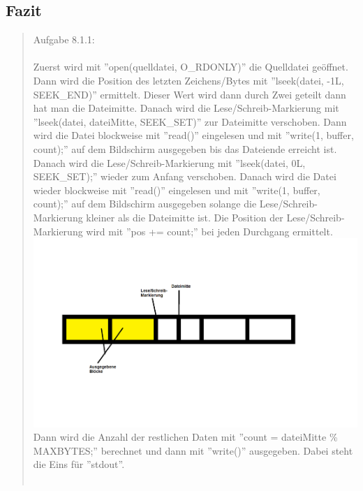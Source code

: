 	\subsection{Fazit}
		\begin{quote}
			Aufgabe 8.1.1:\\ \\
			\small
			\normalsize Zuerst wird mit ''open(quelldatei, O\_RDONLY)'' die Quelldatei ge\"offnet. Dann wird die Position des letzten Zeichens/Bytes mit ''lseek(datei, -1L, SEEK\_END)'' ermittelt. Dieser Wert wird dann durch Zwei geteilt dann hat man die Dateimitte. Danach wird die Lese/Schreib-Markierung mit ''lseek(datei, dateiMitte, SEEK\_SET)'' zur Dateimitte verschoben. Dann wird die Datei blockweise mit ''read()'' eingelesen und mit ''write(1, buffer, count);'' auf dem Bildschirm ausgegeben bis das Dateiende erreicht ist. Danach wird die Lese/Schreib-Markierung mit ''lseek(datei, 0L, SEEK\_SET);'' wieder zum Anfang verschoben. Danach wird die Datei wieder blockweise mit ''read()'' eingelesen und mit ''write(1, buffer, count);'' auf dem Bildschirm ausgegeben solange die Lese/Schreib-Markierung kleiner als die Dateimitte ist. Die Position der Lese/Schreib-Markierung  wird mit ''pos += count;'' bei jeden Durchgang ermittelt.\\
			\includegraphics[width=0.7\linewidth]{content/Bsp1}\\
			Dann wird die Anzahl der restlichen Daten mit ''count = dateiMitte \% MAXBYTES;'' berechnet und dann mit ''write()'' ausgegeben. Dabei steht die Eins f\"ur ''stdout''.\\ \\
			

\end{quote}

